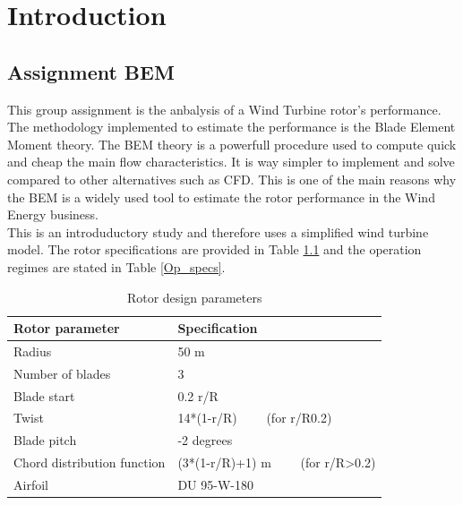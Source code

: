 \chapter{Introduction}

\section{Assignment BEM }

This group assignment is the anbalysis of a Wind Turbine rotor's performance. The methodology implemented to estimate the performance is the Blade Element Moment theory. The BEM theory is a powerfull procedure used to compute quick and cheap the main flow characteristics. It is way simpler to implement and solve compared to other alternatives such as CFD. This is one of the main reasons why the BEM is a widely used tool to estimate the rotor performance in the Wind Energy business. \\

This is an introduductory study and therefore uses a simplified wind turbine model. The rotor specifications are provided in Table \ref{Rot_specs} and the operation regimes are stated in Table \ref{Op_specs}.

\begin{table} [htbp]
\centering
\caption{Rotor design parameters}
\begin{tabular}{|l|l|} 
\hline
\textbf{Rotor parameter}    & \textbf{Specification}                             \\ 
\hline
Radius                      & 50 m                                               \\ 
\hline
Number of blades            & 3                                                  \\ 
\hline
Blade start                 & 0.2 r/R                                            \\ 
\hline
Twist                       & 14*(1-r/R)~~~~ (for r/R0.2)                       \\ 
\hline
Blade pitch                 & -2 degrees                                         \\ 
\hline
Chord distribution function & (3*(1-r/R)+1) m~~~~ (for r/R\textgreater{}0.2)   \\ 
\hline
Airfoil                     & DU 95-W-180                                        \\
\hline
\end{tabular}
\label{Rot_specs}
\end{table}  

